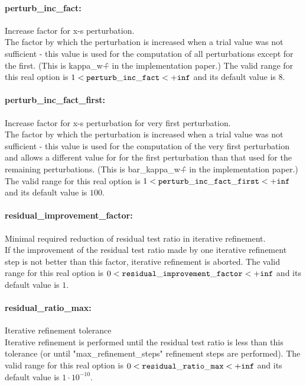 \paragraph{perturb\_inc\_fact:}\label{sec:perturb_inc_fact} Increase factor for x-s perturbation. $\;$ \\
 The factor by which the perturbation is increased
when a trial value was not sufficient - this
value is used for the computation of all
perturbations except for the first. (This is
kappa\_w\^+ in the implementation paper.) The valid range for this real option is 
$1 <  {\tt perturb\_inc\_fact } <  {\tt +inf}$
and its default value is $8$.


\paragraph{perturb\_inc\_fact\_first:}\label{sec:perturb_inc_fact_first} Increase factor for x-s perturbation for very first perturbation. $\;$ \\
 The factor by which the perturbation is increased
when a trial value was not sufficient - this
value is used for the computation of the very
first perturbation and allows a different value
for for the first perturbation than that used for
the remaining perturbations. (This is
bar\_kappa\_w\^+ in the implementation paper.) The valid range for this real option is 
$1 <  {\tt perturb\_inc\_fact\_first } <  {\tt +inf}$
and its default value is $100$.


\paragraph{residual\_improvement\_factor:}\label{sec:residual_improvement_factor} Minimal required reduction of residual test ratio in iterative refinement. $\;$ \\
 If the improvement of the residual test ratio
made by one iterative refinement step is not
better than this factor, iterative refinement is
aborted. The valid range for this real option is 
$0 <  {\tt residual\_improvement\_factor } <  {\tt +inf}$
and its default value is $1$.


\paragraph{residual\_ratio\_max:}\label{sec:residual_ratio_max} Iterative refinement tolerance $\;$ \\
 Iterative refinement is performed until the
residual test ratio is less than this tolerance
(or until "max\_refinement\_steps" refinement
steps are performed). The valid range for this real option is 
$0 <  {\tt residual\_ratio\_max } <  {\tt +inf}$
and its default value is $1 \cdot 10^{-10}$.


